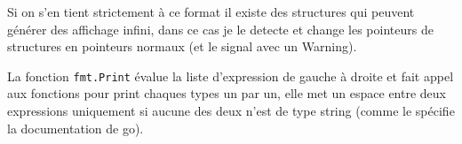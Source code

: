 \documentclass[9pt,a4paper]{article}
\begin{document}
Si on s'en tient strictement à ce format il existe des structures qui peuvent générer des affichage infini, dans ce cas je le detecte et change les pointeurs de structures en pointeurs normaux (et le signal avec un Warning).

La fonction \verb|fmt.Print| évalue la liste d'expression de gauche à droite et fait appel aux fonctions pour print chaques types un par un, elle met un espace entre deux expressions uniquement si aucune des deux n'est de type string (comme le spécifie la documentation de go).
\end{document}
